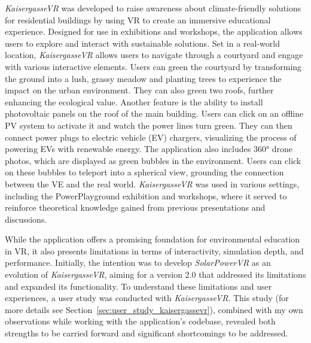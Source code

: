 \documentclass[draft, final]{vutinfth} %
\begin{document}
\textit{KaisergasseVR} was developed to raise awareness about climate-friendly solutions for residential buildings by using VR to create an immersive educational experience. Designed for use in exhibitions and workshops, the application allows users to explore and interact with sustainable solutions. Set in a real-world location, \textit{KaisergasseVR} allows users to navigate through a courtyard and engage with various interactive elements. Users can green the courtyard by transforming the ground into a lush, grassy meadow and planting trees to experience the impact on the urban environment. They can also green two roofs, further enhancing the ecological value. Another feature is the ability to install photovoltaic panels on the roof of the main building. Users can click on an offline PV system to activate it and watch the power lines turn green. They can then connect power plugs to electric vehicle (EV) chargers, visualizing the process of powering EVs with renewable energy. The application also includes 360° drone photos, which are displayed as green bubbles in the environment. Users can click on these bubbles to teleport into a spherical view, grounding the connection between the VE and the real world. \textit{KaisergasseVR} was used in various settings, including the PowerPlayground exhibition and workshops, where it served to reinforce theoretical knowledge gained from previous presentations and discussions.

While the application offers a promising foundation for environmental education in VR, it also presents limitations in terms of interactivity, simulation depth, and performance. Initially, the intention was to develop \textit{SolarPowerVR} as an evolution of \textit{KaisergasseVR}, aiming for a version 2.0 that addressed its limitations and expanded its functionality. To understand these limitations and user experiences, a user study was conducted with \textit{KaisergasseVR}. This study (for more details see Section~\ref{sec:user_study_kaisergassevr}), combined with my own observations while working with the application's codebase, revealed both strengths to be carried forward and significant shortcomings to be addressed.
\end{document}
